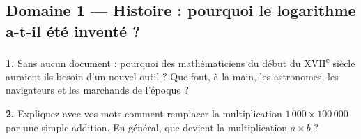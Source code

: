 \documentclass[11pt,a4paper]{article}
\begin{document}
\subsection*{Domaine 1 --- Histoire : pourquoi le logarithme a-t-il été inventé ?}
\textbf{1.} Sans aucun document : pourquoi des mathématiciens du début du XVII\textsuperscript{e} siècle auraient-ils besoin d'un nouvel outil ? Que font, à la main, les astronomes, les navigateurs et les marchands de l'époque ?
\par\smallskip
\noindent\makebox[\linewidth]{\dotfill}\par\vspace{1em}
\noindent\makebox[\linewidth]{\dotfill}\par\vspace{1em}
\noindent\makebox[\linewidth]{\dotfill}\par\vspace{1em}
\par\medskip
\textbf{2.} Expliquez avec vos mots comment remplacer la multiplication $1\,000 \times 100\,000$ par une simple addition. En général, que devient la multiplication $a \times b$ ?
\par\smallskip
\noindent\makebox[\linewidth]{\dotfill}\par\vspace{1em}
\noindent\makebox[\linewidth]{\dotfill}\par\vspace{1em}
\noindent\makebox[\linewidth]{\dotfill}\par\vspace{1em}
\par\medskip
\end{document}
